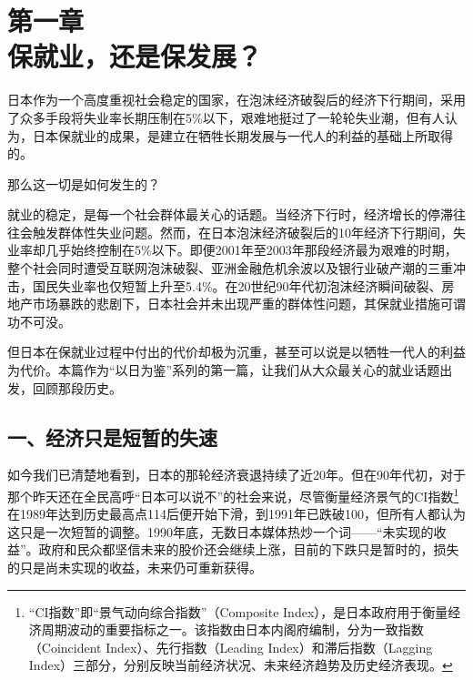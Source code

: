 

\section[第一章\q 保就业，还是保发展？]{第一章\\ 保就业，还是保发展？}


{\fangsong 日本作为一个高度重视社会稳定的国家，在泡沫经济破裂后的经济下行期间，采用了众多手段将失业率长期压制在5\%以下，艰难地挺过了一轮轮失业潮，但有人认为，日本保就业的成果，是建立在牺牲长期发展与一代人的利益的基础上所取得的。\par}

{\fangsong 那么这一切是如何发生的？\par}

就业的稳定，是每一个社会群体最关心的话题。当经济下行时，经济增长的停滞往往会触发群体性失业问题。然而，在日本泡沫经济破裂后的10年经济下行期间，失业率却几乎始终控制在5\%以下。即便2001年至2003年那段经济最为艰难的时期，整个社会同时遭受互联网泡沫破裂、亚洲金融危机余波以及银行业破产潮的三重冲击，国民失业率也仅短暂上升至5.4\%。在20世纪90年代初泡沫经济瞬间破裂、房地产市场暴跌的悲剧下，日本社会并未出现严重的群体性问题，其保就业措施可谓功不可没。

但日本在保就业过程中付出的代价却极为沉重，甚至可以说是以牺牲一代人的利益为代价。本篇作为“以日为鉴”系列的第一篇，让我们从大众最关心的就业话题出发，回顾那段历史。

\subsection{一、经济只是短暂的失速}

如今我们已清楚地看到，日本的那轮经济衰退持续了近20年。但在90年代初，对于那个昨天还在全民高呼“日本可以说不”的社会来说，尽管衡量经济景气的CI指数\footnote{“CI指数”即“景气动向综合指数”（Composite Index），是日本政府用于衡量经济周期波动的重要指标之一。该指数由日本内阁府编制，分为一致指数（Coincident Index）、先行指数（Leading Index）和滞后指数（Lagging Index）三部分，分别反映当前经济状况、未来经济趋势及历史经济表现。}在1989年达到历史最高点114后便开始下滑，到1991年已跌破100，但所有人都认为这只是一次短暂的调整。1990年底，无数日本媒体热炒一个词——“未实现的收益”。政府和民众都坚信未来的股价还会继续上涨，目前的下跌只是暂时的，损失的只是尚未实现的收益，未来仍可重新获得。

